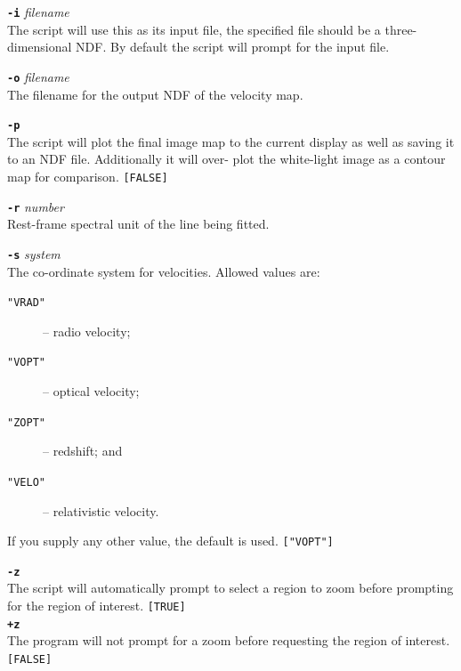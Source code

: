 \documentclass[twoside,11pt]{article}
\begin{document}
{{{         \sstitem
         {\bf{\tt{-i}}} {\em filename}\\
           The script will use this as its input file, the specified file
           should be a three-dimensional NDF.  By default the script will
           prompt for the input file.

         \sstitem
         {\bf{\tt{-o}}} {\em filename}\\
           The filename for the output NDF of the velocity map.

         \sstitem
         {\bf{\tt{-p}}}\\
           The script will plot the final image map to the current display
           as well as saving it to an NDF file.  Additionally it will over-
           plot the white-light image as a contour map for comparison.
           {\tt [FALSE]}

         \sstitem
         {\bf{\tt{-r}}} {\em number}\\
           Rest-frame spectral unit of the line being fitted.

         \sstitem
         {\bf{\tt{-s}}} {\em system}\\
           The co-ordinate system for velocities.  Allowed values are:
           \begin{description}
           \item[{\tt "VRAD"}] -- radio velocity;
           \item[{\tt "VOPT"}] -- optical velocity;
           \item[{\tt "ZOPT"}] -- redshift; and
           \item[{\tt "VELO"}] -- relativistic velocity.
           \end{description}
           If you supply any other value, the default is used.  {\tt ["VOPT"]}

         \sstitem
         {\bf{\tt{-z}}}\\
           The script will automatically prompt to select a region to zoom
           before prompting for the region of interest.  {\tt [TRUE]}\\
         {\bf{\tt{+z}}}\\
           The program will not prompt for a zoom before requesting the region
           of interest. {\tt [FALSE]}
      }
   }
   }
\end{document}
